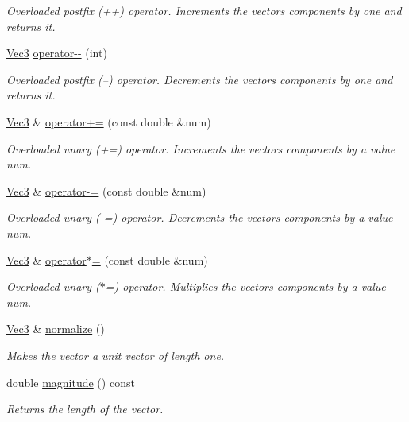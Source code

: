 \begin{DoxyCompactItemize}
\begin{DoxyCompactList}\small\item\em Overloaded postfix (++) operator. Increments the vectors components by one and returns it. \end{DoxyCompactList}\item 
\mbox{\hyperlink{classVec3}{Vec3}} \mbox{\hyperlink{classVec3_af7ab68e162bbec89988a914dbf14c371}{operator-\/-\/}} (int)
\begin{DoxyCompactList}\small\item\em Overloaded postfix (--) operator. Decrements the vectors components by one and returns it. \end{DoxyCompactList}\item 
\mbox{\hyperlink{classVec3}{Vec3}} \& \mbox{\hyperlink{classVec3_a7e84982381bd5c28104d1da23e01de05}{operator+=}} (const double \&num)
\begin{DoxyCompactList}\small\item\em Overloaded unary (+=) operator. Increments the vector\textquotesingle{}s components by a value num. \end{DoxyCompactList}\item 
\mbox{\hyperlink{classVec3}{Vec3}} \& \mbox{\hyperlink{classVec3_a36e57fe7792f322226047185219f8783}{operator-\/=}} (const double \&num)
\begin{DoxyCompactList}\small\item\em Overloaded unary (-\/=) operator. Decrements the vector\textquotesingle{}s components by a value num. \end{DoxyCompactList}\item 
\mbox{\hyperlink{classVec3}{Vec3}} \& \mbox{\hyperlink{classVec3_a95bcd936b220a060e801e7ae44714adf}{operator$\ast$=}} (const double \&num)
\begin{DoxyCompactList}\small\item\em Overloaded unary ($\ast$=) operator. Multiplies the vector\textquotesingle{}s components by a value num. \end{DoxyCompactList}\item 
\mbox{\hyperlink{classVec3}{Vec3}} \& \mbox{\hyperlink{classVec3_a178adc51fcda1b1e2acb50fffb8d3a96}{normalize}} ()
\begin{DoxyCompactList}\small\item\em Makes the vector a unit vector of length one. \end{DoxyCompactList}\item 
double \mbox{\hyperlink{classVec3_adfb6f8c3015191ddde74770e1c873e47}{magnitude}} () const
\begin{DoxyCompactList}\small\item\em Returns the length of the vector. \end{DoxyCompactList}\end{DoxyCompactItemize}


